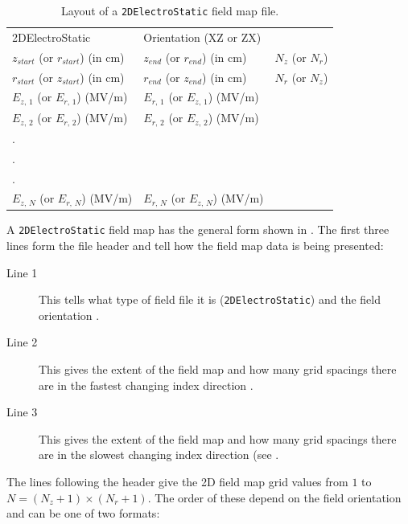\begin{table}[h!]
    \caption{Layout of a \texttt{2DElectroStatic} field map file.}
    \label{tab:2DElectroStatic}
    \begin{center}
    \begin{tabular}{lll}
      \hline
      2DElectroStatic & Orientation (XZ or ZX) & \\
      $z_{start}$ (or $r_{start}$) (in cm) & $z_{end}$ (or $r_{end}$) (in cm) & $N_{z}$ (or $N_{r}$) \\
      $r_{start}$ (or $z_{start}$) (in cm) & $r_{end}$ (or $z_{end}$) (in cm) & $N_{r}$ (or $N_{z}$) \\
      $E_{z,\,1}$ (or $E_{r,\,1}$) (MV/m) & $E_{r,\,1}$ (or $E_{z,\,1}$) (MV/m)& \\
      $E_{z,\,2}$ (or $E_{r,\,2}$) (MV/m) & $E_{r,\,2}$ (or $E_{z,\,2}$) (MV/m)& \\
      . & & \\
      . & & \\
      . & & \\
      $E_{z,\,N}$ (or $E_{r,\,N}$) (MV/m) & $E_{r,\,N}$ (or $E_{z,\,N}$) (MV/m)& \\
      \hline
    \end{tabular}
    \end{center}
\end{table}

A \texttt{2DElectroStatic} field map has the general form shown in . The first three lines form
the file header and tell \opalt how the field map data is being presented:

\begin{description}
\item[Line 1] This tells \opalt what type of field file it is (\texttt{2DElectroStatic}) and the field orientation
  .
\item[Line 2] This gives the extent of the field map and how many grid spacings there are in the fastest changing
  index direction .
\item[Line 3] This gives the extent of the field map and how many grid spacings there are in the slowest changing
  index direction (see .
\end{description}

The lines following the header give the 2D field map grid values from $1$ to $N = (N_{z} + 1) \times (N_{r} + 1)$.
The order of these depend on the field orientation  and can be one of two formats:

